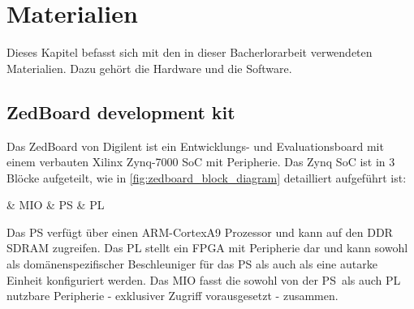 \chapter{Materialien}
\label{cha:materials}

Dieses Kapitel befasst sich mit den in dieser Bacherlorarbeit verwendeten Materialien. Dazu gehört die Hardware und die Software.

\section{ZedBoard development kit}
\label{sec:basics_zedboard}

Das ZedBoard von Digilent ist ein Entwicklungs- und Evaluationsboard mit einem verbauten Xilinx Zynq-7000 \gls{SoC} mit Peripherie. 
Das Zynq \gls{SoC} ist in 3 Blöcke aufgeteilt, wie in \cref{fig:zedboard_block_diagram} detailliert aufgeführt ist:

\begin{easylist}[itemize]
	& \gls{MIO}
	& \gls{PS}
	& \gls{PL}
\end{easylist}

Das \gls{PS} verfügt über einen \gls{ARM}-Cortex\texttrademark A9 Prozessor und kann auf den \gls{DDR SDRAM} zugreifen.
Das \gls{PL} stellt ein \gls{FPGA} mit Peripherie dar und kann sowohl als domänenspezifischer Beschleuniger für das \gls{PS} als auch als eine autarke Einheit konfiguriert werden.
Das \gls{MIO} fasst die sowohl von der \gls{PS} als auch \gls{PL} nutzbare Peripherie - exklusiver Zugriff vorausgesetzt - zusammen. 

%

